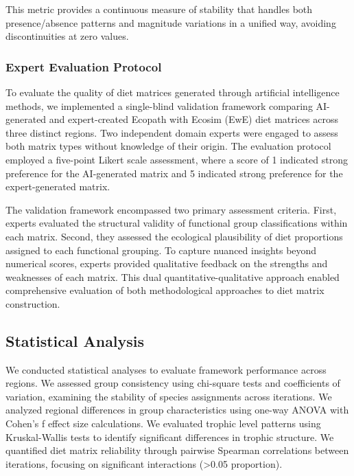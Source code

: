 This metric provides a continuous measure of stability that handles both presence/absence patterns and magnitude variations in a unified way, avoiding discontinuities at zero values.

\subsubsection{Expert Evaluation Protocol}
To evaluate the quality of diet matrices generated through artificial intelligence methods, we implemented a single-blind validation framework comparing AI-generated and expert-created Ecopath with Ecosim (EwE) diet matrices across three distinct regions. Two independent domain experts were engaged to assess both matrix types without knowledge of their origin. The evaluation protocol employed a five-point Likert scale assessment, where a score of 1 indicated strong preference for the AI-generated matrix and 5 indicated strong preference for the expert-generated matrix. 

The validation framework encompassed two primary assessment criteria. First, experts evaluated the structural validity of functional group classifications within each matrix. Second, they assessed the ecological plausibility of diet proportions assigned to each functional grouping. To capture nuanced insights beyond numerical scores, experts provided qualitative feedback on the strengths and weaknesses of each matrix. This dual quantitative-qualitative approach enabled comprehensive evaluation of both methodological approaches to diet matrix construction.

\subsection{Statistical Analysis}
We conducted statistical analyses to evaluate framework performance across regions. We assessed group consistency using chi-square tests and coefficients of variation, examining the stability of species assignments across iterations. We analyzed regional differences in group characteristics using one-way ANOVA with Cohen's f effect size calculations. We evaluated trophic level patterns using Kruskal-Wallis tests to identify significant differences in trophic structure. We quantified diet matrix reliability through pairwise Spearman correlations between iterations, focusing on significant interactions (>0.05 proportion).
